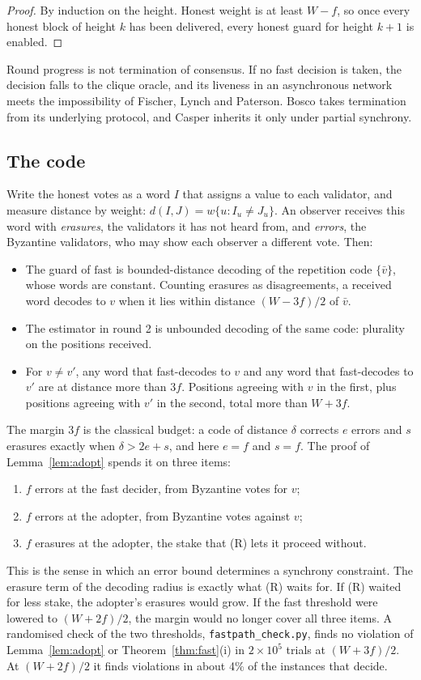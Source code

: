 \documentclass[11pt]{article}
\theoremstyle{definition}
\theoremstyle{remark}
\begin{document}
\begin{proof}
By induction on the height. Honest weight is at least $W-f$, so once every
honest block of height $k$ has been delivered, every honest guard for height
$k+1$ is enabled.
\end{proof}

Round progress is not termination of consensus. If no fast decision is taken,
the decision falls to the clique oracle, and its liveness in an asynchronous
network meets the impossibility of Fischer, Lynch and Paterson. Bosco takes
termination from its underlying protocol, and Casper inherits it only under
partial synchrony.

\subsection{The code}

Write the honest votes as a word $I$ that assigns a value to each validator,
and measure distance by weight: $d(I,J)=w\{u:I_u\ne J_u\}$. An observer
receives this word with \emph{erasures}, the validators it has not heard from,
and \emph{errors}, the Byzantine validators, who may show each observer a
different vote. Then:
\begin{itemize}[leftmargin=1.5em]
\item The guard of $\mathrm{fast}$ is bounded-distance decoding of the
  repetition code $\{\bar v\}$, whose words are constant. Counting erasures
  as disagreements, a received word decodes to $v$ when it lies within
  distance $(W-3f)/2$ of $\bar v$.
\item The estimator in round 2 is unbounded decoding of the same code:
  plurality on the positions received.
\item For $v\ne v'$, any word that fast-decodes to $v$ and any word that
  fast-decodes to $v'$ are at distance more than $3f$. Positions agreeing with
  $v$ in the first, plus positions agreeing with $v'$ in the second, total more
  than $W+3f$.
\end{itemize}
The margin $3f$ is the classical budget: a code of distance $\delta$ corrects
$e$ errors and $s$ erasures exactly when $\delta>2e+s$, and here $e=f$ and
$s=f$. The proof of Lemma~\ref{lem:adopt} spends it on three items:
\begin{enumerate}[label=(\alph*)]
\item $f$ errors at the fast decider, from Byzantine votes for $v$;
\item $f$ errors at the adopter, from Byzantine votes against $v$;
\item $f$ erasures at the adopter, the stake that (R) lets it proceed without.
\end{enumerate}
This is the sense in which an error bound determines a synchrony constraint.
The erasure term of the decoding radius is exactly what (R) waits for. If (R)
waited for less stake, the adopter's erasures would grow. If the fast threshold
were lowered to $(W+2f)/2$, the margin would no longer cover all three items. A
randomised check of the two thresholds, \texttt{fastpath\_check.py}, finds
no violation of Lemma~\ref{lem:adopt} or Theorem~\ref{thm:fast}(i) in
$2\times10^5$ trials at $(W+3f)/2$. At $(W+2f)/2$ it finds violations in about
4\% of the instances that decide.
\end{document}
